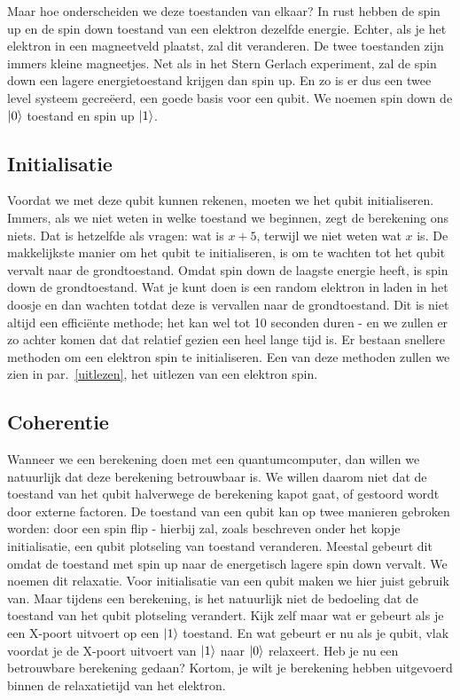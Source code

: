 \documentclass[../../main.tex]{subfiles}
\begin{document}
Maar hoe onderscheiden we deze toestanden van elkaar? In rust hebben de spin up en de spin down toestand van een elektron dezelfde energie. Echter, als je het elektron in een magneetveld plaatst, zal dit veranderen. De twee toestanden zijn immers kleine magneetjes. Net als in het Stern Gerlach experiment, zal de spin down een lagere energietoestand krijgen dan spin up. En zo is er dus een twee level systeem gecre\"eerd, een goede basis voor een qubit. We noemen spin down de $\ket{0}$ toestand en spin up $\ket{1}$.

\subsection{Initialisatie}
Voordat we met deze qubit kunnen rekenen, moeten we het qubit initialiseren. Immers, als we niet weten in welke toestand we beginnen, zegt de berekening ons niets. Dat is hetzelfde als vragen: wat is $x+5$, terwijl we niet weten wat $x$ is. De makkelijkste manier om het qubit te initialiseren, is om te wachten tot het qubit vervalt naar de grondtoestand. Omdat spin down de laagste energie heeft, is spin down de grondtoestand. Wat je kunt doen is een random elektron in laden in het doosje en dan wachten totdat deze is vervallen naar de grondtoestand. Dit is niet altijd een effici\"ente methode; het kan wel tot 10 seconden duren - en we zullen er zo achter komen dat dat relatief gezien een heel lange tijd is. Er bestaan snellere methoden om een elektron spin te initialiseren. Een van deze methoden zullen we zien in par.~\ref{uitlezen}, het uitlezen van een elektron spin.


\subsection{Coherentie}
Wanneer we een berekening doen met een quantumcomputer, dan willen we natuurlijk dat deze berekening betrouwbaar is. We willen daarom niet dat de toestand  van het qubit halverwege de berekening kapot gaat, of gestoord wordt door externe factoren. De toestand van een qubit kan op twee manieren gebroken worden: door een spin flip - hierbij zal, zoals beschreven onder het kopje initialisatie, een qubit plotseling van toestand veranderen. Meestal gebeurt dit omdat de toestand met spin up naar de energetisch lagere spin down vervalt. We noemen dit relaxatie. Voor initialisatie van een qubit maken we hier juist gebruik van. Maar tijdens een berekening, is het natuurlijk niet de bedoeling dat de toestand van het qubit plotseling verandert. Kijk zelf maar wat er gebeurt als je een X-poort uitvoert op een $\ket{1}$ toestand. En wat gebeurt er nu als je qubit, vlak voordat je de X-poort uitvoert van $\ket{1}$ naar $\ket{0}$ relaxeert. Heb je nu een betrouwbare berekening gedaan? Kortom, je wilt je berekening hebben uitgevoerd binnen de relaxatietijd van het elektron.
\end{document}
